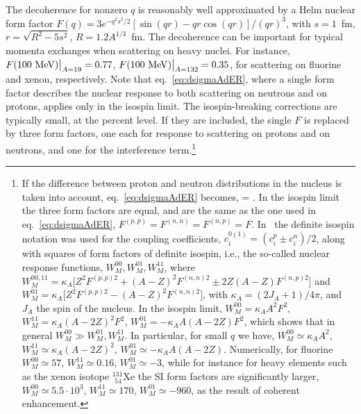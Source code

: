  The decoherence for nonzero $q$ is reasonably well approximated by a Helm nuclear
form factor $F(q) = 3e^{-q^2 s^2/2}[\sin(qr)-qr\cos(qr)]/(qr)^3$, with $s=1$~fm, $r = \sqrt{R^2 - 5s^2}$, $R = 1.2A^{1/3}$~fm.
The decoherence can be important for typical momenta exchanges when scattering on heavy nuclei. For instance, $F(100{\rm~MeV})\big|_{A=19}=0.77$, $F(100{\rm~MeV})\big|_{A=132}=0.35$, for scattering on fluorine and xenon, respectively.  Note that eq.~\eqref{eq:dsigmaAdER}, where a single form factor  describes the nuclear response to both scattering on neutrons and on protons, applies only in the isospin limit. The isospin-breaking corrections are typically small, at the percent level. If they are included, the single $F$ is replaced by three form factors, one each for response to scattering on protons and on neutrons, and one for the interference term.\footnote{If the difference between proton and neutron distributions in the nucleus is taken into account,  eq.~\eqref{eq:dsigmaAdER} becomes,
\beq 
{} =
.
\eeq
In the isospin limit the three form factors are equal, and are the same as the one used in eq.~\eqref{eq:dsigmaAdER},  
$F^{(p,p)}=F^{(n,n)}=F^{(n,p)}=F$. 
In~\cite{Anand:2013yka} the definite isospin notation was used for the coupling coefficients, $c_i^{0(1)}=(c_i^p\pm c_i^n)/2$, along with squares of form factors of definite isospin,  i.e., the so-called nuclear response functions, $W_{M}^{00}, W_M^{01}, W_M^{11}$, where
$W_M^{00,11}=\kappa_A \big[Z^2 F^{(p,p)2}+ (A-Z)^2 F^{(n,n)2} \pm 2 Z(A-Z) F^{(n,p)2}\big] $ and $W_M^{01}= \kappa_A \big[Z^2 F^{(p,p)2}- (A-Z)^2 F^{(n,n)2}\big] $, with $\kappa_A= (2J_A+1)/4\pi $, and $J_A$ the spin of the nucleus. In the isospin limit, $W_M^{00}=\kappa_A A^2 F^2 $,  $W_M^{11}=\kappa_A (A-2Z)^2 F^2$, $W_M^{01}= - \kappa_A A(A-2Z) F^2 $, which shows that  in general $W_M^{00}\gg W_M^{01}, W_M^{11}$. In particular, for small $q$ we have, $W_M^{00}\simeq \kappa_A A^2$,  $W_M^{11}\simeq \kappa_A (A-2Z)^2 $, $W_M^{01}\simeq - \kappa_A A(A-2Z)$. Numerically, for fluorine $W_M^{00}\simeq 57$,  $W_M^{11}\simeq 0.16 $, $W_M^{01}\simeq - 3$, while for instance for heavy elements such as the xenon isotope ${}^{131}_{\,\,54}$Xe the SI form factors are significantly larger, $W_M^{00}\simeq 5.5 \cdot 10^3$,  $W_M^{11}\simeq 170 $, $W_M^{01}\simeq - 960$, as the result of coherent enhancement.
}

\medskip

